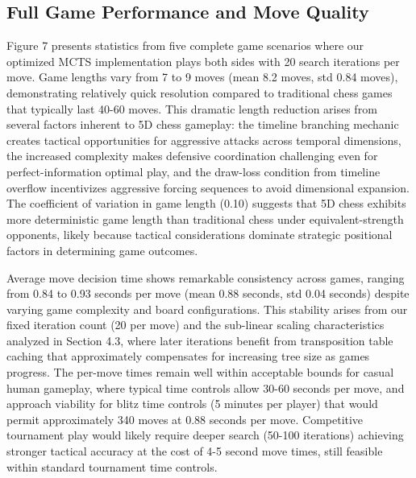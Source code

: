 \documentclass{article}
\begin{document}
\subsection{Full Game Performance and Move Quality}

Figure 7 presents statistics from five complete game scenarios where our optimized MCTS implementation plays both sides with 20 search iterations per move. Game lengths vary from 7 to 9 moves (mean 8.2 moves, std 0.84 moves), demonstrating relatively quick resolution compared to traditional chess games that typically last 40-60 moves. This dramatic length reduction arises from several factors inherent to 5D chess gameplay: the timeline branching mechanic creates tactical opportunities for aggressive attacks across temporal dimensions, the increased complexity makes defensive coordination challenging even for perfect-information optimal play, and the draw-loss condition from timeline overflow incentivizes aggressive forcing sequences to avoid dimensional expansion. The coefficient of variation in game length (0.10) suggests that 5D chess exhibits more deterministic game length than traditional chess under equivalent-strength opponents, likely because tactical considerations dominate strategic positional factors in determining game outcomes.

Average move decision time shows remarkable consistency across games, ranging from 0.84 to 0.93 seconds per move (mean 0.88 seconds, std 0.04 seconds) despite varying game complexity and board configurations. This stability arises from our fixed iteration count (20 per move) and the sub-linear scaling characteristics analyzed in Section 4.3, where later iterations benefit from transposition table caching that approximately compensates for increasing tree size as games progress. The per-move times remain well within acceptable bounds for casual human gameplay, where typical time controls allow 30-60 seconds per move, and approach viability for blitz time controls (5 minutes per player) that would permit approximately 340 moves at 0.88 seconds per move. Competitive tournament play would likely require deeper search (50-100 iterations) achieving stronger tactical accuracy at the cost of 4-5 second move times, still feasible within standard tournament time controls.
\end{document}
